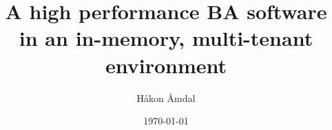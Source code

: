 \title{A high performance BA software in an in-memory, multi-tenant environment}
\author{Håkon Åmdal}
\date{\today}

